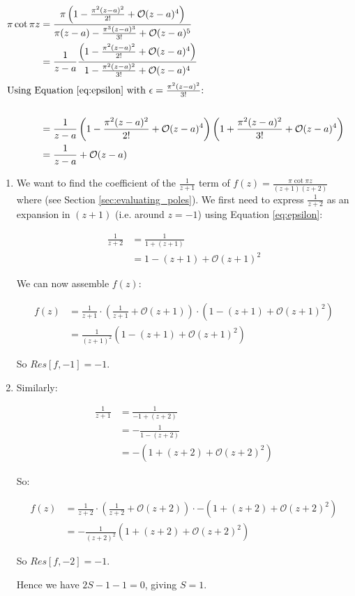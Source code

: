 \documentclass{../../physics_notes}
\begin{document}
\begin{align*}
	\pi \cot{\pi z} &= \frac{\pi\left(1 - \frac{\pi^2(z-a)^2}{2!} + \mathcal{O}(z-a)^4\right)}{\pi (z-a) - \frac{\pi^3 (z-a)^3}{3!} + \mathcal{O}(z-a)^5} \\
	&= \frac{1}{z-a}\frac{\left(1 - \frac{\pi^2(z-a)^2}{2!} + \mathcal{O}(z-a)^4\right)}{1 - \frac{\pi^2 (z-a)^2}{3!} + \mathcal{O}(z-a)^4} \\
	\intertext{Using Equation \ref{eq:epsilon} with $\epsilon=\frac{\pi^2 (z-a)^2}{3!}$:} \\
	&= \frac{1}{z-a}\left(1 - \frac{\pi^2(z-a)^2}{2!} + \mathcal{O}(z-a)^4\right)\left(1 + \frac{\pi^2 (z-a)^2}{3!} + \mathcal{O}(z-a)^4\right) \\
	&= \frac{1}{z-a} + \mathcal{O}(z-a)
\end{align*}

\begin{enumerate}[label={$z_0 =-\arabic*$:}]
	\item{
		We want to find the coefficient of the $\frac{1}{z+1}$ term of $f(z) = \frac{\pi\cot{\pi z}}{(z+1)(z+2)}$ where (see Section \ref{sec:evaluating_poles}). We first need to express $\frac{1}{z+2}$ as an expansion in $(z+1)$ (i.e. around $z=-1$) using Equation \ref{eq:epsilon}:

		\begin{align*}
			\frac{1}{z+2} &= \frac{1}{1+(z+1)} \\
			&= 1 - (z+1) + \mathcal{O}(z+1)^2
		\end{align*}

		We can now assemble $f(z)$:

		\begin{align*} 
			f(z) &= \frac{1}{z+1}\cdot\left(\frac{1}{z+1} + \mathcal{O}(z+1)\right)\cdot\left(1 - (z+1) + \mathcal{O}(z+1)^2\right)\\
			&= \frac{1}{(z+1)^2}\left(1-(z+1) + \mathcal{O}(z+1)^2\right)
		 \end{align*}

		 So $Res[f,-1] = -1$.
	}
	\item{
		Similarly:

		\begin{align*}
			\frac{1}{z+1} &= \frac{1}{-1+(z+2)} \\
			&= -\frac{1}{1-(z+2)} \\
			&= -(1 + (z+2) + \mathcal{O}(z+2)^2)
		\end{align*}

		So:

		\begin{align*} 
			f(z) &= \frac{1}{z+2}\cdot\left(\frac{1}{z+2} + \mathcal{O}(z+2)\right)\cdot-\left(1 + (z+2) + \mathcal{O}(z+2)^2\right)\\
			&= -\frac{1}{(z+2)^2}\left(1+(z+2) + \mathcal{O}(z+2)^2\right)
		 \end{align*}

		 So $Res[f,-2] = -1$.
	}

	Hence we have $2S-1-1=0$, giving $S=1$.
\end{enumerate}

\newpage
\printindex
\end{document}
